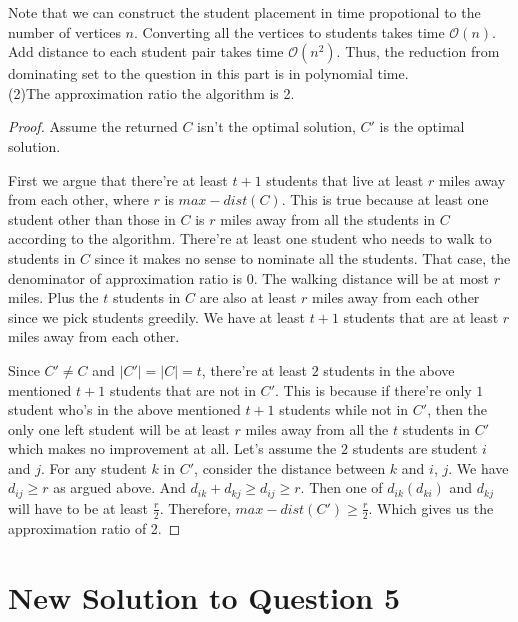 \documentclass[11pt]{article}
\renewcommand{\O}{\mathcal{O}}
\begin{document}
\noindent Note that we can construct the student placement in time propotional to the number of vertices $n$.
	Converting all the vertices to students takes time $\O(n)$.
	Add distance to each student pair takes time $\O(n^2)$.
	Thus, the reduction from dominating set to the question in this part is in polynomial time.\\

\noindent (2)The approximation ratio the algorithm is 2.

\begin{proof}
	Assume the returned $C$ isn't the optimal solution, $C'$ is the optimal solution.

	\noindent First we argue that there're at least $t+1$ students that live at least $r$ miles away from each other, where $r$ is $max-dist(C)$.
	This is true because at least one student other than those in $C$ is $r$ miles away from all the students in $C$ according to the algorithm.
	There're at least one student who needs to walk to students in $C$ since it makes no sense to nominate all the students.
	That case, the denominator of approximation ratio is $0$.
	The walking distance will be at most $r$ miles.
	Plus the $t$ students in $C$ are also at least $r$ miles away from each other since we pick students greedily.
	We have at least $t+1$ students that are at least $r$ miles away from each other.

	\noindent Since $C' \neq C$ and $|C'| = |C| = t$, there're at least $2$ students in the above mentioned $t+1$ students that are not in $C'$.
	This is because if there're only $1$ student who's in the above mentioned $t+1$ students while not in $C'$, then the only one left student will be at least $r$ miles away from all the $t$ students in $C'$ which makes no improvement at all.
	Let's assume the $2$ students are student $i$ and $j$.
	For any student $k$ in $C'$, consider the distance between $k$ and $i$, $j$.
	We have $d_{ij} \geq r$ as argued above.
	And $d_{ik} + d_{kj} \geq d_{ij} \geq r$. Then one of $d_{ik} (d_{ki})$ and $d_{kj}$ will have to be at least $\frac{r}{2}$.
	Therefore, $max-dist(C') \geq \frac{r}{2}$.
	Which gives us the approximation ratio of 2.
\end{proof}

\section{New Solution to Question 5}
\end{document}
